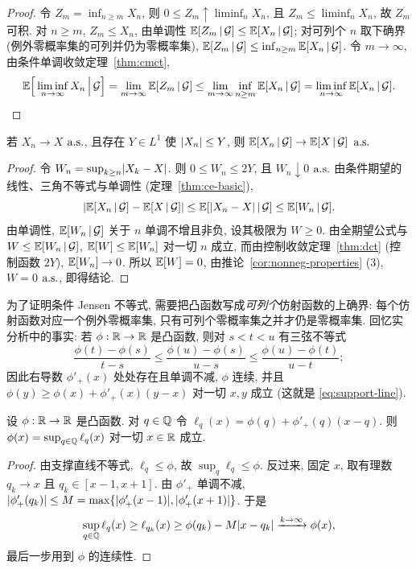 \begin{proof}
令 $Z_m=\inf_{n\ge m}X_n$, 则 $0\le Z_m\uparrow\liminf_nX_n$, 且 $Z_m\le\liminf_nX_n$, 故 $Z_m$ 可积. 对 $n\ge m$, $Z_m\le X_n$, 由单调性 $\mathbb{E}[Z_m\,|\,\mathcal{G}]\le\mathbb{E}[X_n\,|\,\mathcal{G}]$; 对可列个 $n$ 取下确界 (例外零概率集的可列并仍为零概率集), $\mathbb{E}[Z_m\,|\,\mathcal{G}]\le\inf_{n\ge m}\mathbb{E}[X_n\,|\,\mathcal{G}]$. 令 $m\to\infty$, 由条件单调收敛定理~\ref{thm:cmct},
\[
\mathbb{E}\Big[\liminf_{n\to\infty}X_n\,\Big|\,\mathcal{G}\Big]=\lim_{m\to\infty}\mathbb{E}[Z_m\,|\,\mathcal{G}]\le\lim_{m\to\infty}\inf_{n\ge m}\mathbb{E}[X_n\,|\,\mathcal{G}]=\liminf_{n\to\infty}\mathbb{E}[X_n\,|\,\mathcal{G}].\qedhere
\]
\end{proof}

\begin{theorem}[条件控制收敛定理]\label{thm:cdct}
若 $X_n\to X$ $\text{a.s.}$, 且存在 $Y\in L^1$ 使 $\lvert X_n\rvert\le Y$, 则 $\mathbb{E}[X_n\,|\,\mathcal{G}]\to\mathbb{E}[X\,|\,\mathcal{G}]$ $\text{a.s.}$
\end{theorem}

\begin{proof}
令 $W_n=\sup_{k\ge n}\lvert X_k-X\rvert$. 则 $0\le W_n\le2Y$, 且 $W_n\downarrow0$ $\text{a.s.}$ 由条件期望的线性、三角不等式与单调性 (定理~\ref{thm:ce-basic}),
\[
\lvert\mathbb{E}[X_n\,|\,\mathcal{G}]-\mathbb{E}[X\,|\,\mathcal{G}]\rvert\le\mathbb{E}[\lvert X_n-X\rvert\,|\,\mathcal{G}]\le\mathbb{E}[W_n\,|\,\mathcal{G}].
\]
由单调性, $\mathbb{E}[W_n\,|\,\mathcal{G}]$ 关于 $n$ 单调不增且非负, 设其极限为 $W\ge0$. 由全期望公式与 $W\le\mathbb{E}[W_n\,|\,\mathcal{G}]$, $\mathbb{E}[W]\le\mathbb{E}[W_n]$ 对一切 $n$ 成立, 而由控制收敛定理~\ref{thm:dct} (控制函数 $2Y$), $\mathbb{E}[W_n]\to0$. 所以 $\mathbb{E}[W]=0$, 由推论~\ref{cor:nonneg-properties} (3), $W=0$ $\text{a.s.}$, 即得结论.
\end{proof}

为了证明条件 Jensen 不等式, 需要把凸函数写成\emph{可列个}仿射函数的上确界: 每个仿射函数对应一个例外零概率集, 只有可列个零概率集之并才仍是零概率集. 回忆实分析中的事实: 若 $\phi:\mathbb{R}\to\mathbb{R}$ 是凸函数, 则对 $s<t<u$ 有三弦不等式
\[
\frac{\phi(t)-\phi(s)}{t-s}\le\frac{\phi(u)-\phi(s)}{u-s}\le\frac{\phi(u)-\phi(t)}{u-t};
\]
因此右导数 $\phi'_+(x)$ 处处存在且单调不减, $\phi$ 连续, 并且 $\phi(y)\ge\phi(x)+\phi'_+(x)(y-x)$ 对一切 $x,y$ 成立 (这就是 \eqref{eq:support-line}).

\begin{lemma}\label{lem:convex-countable}
设 $\phi:\mathbb{R}\to\mathbb{R}$ 是凸函数. 对 $q\in\mathbb{Q}$ 令 $\ell_q(x)=\phi(q)+\phi'_+(q)(x-q)$. 则 $\phi(x)=\sup_{q\in\mathbb{Q}}\ell_q(x)$ 对一切 $x\in\mathbb{R}$ 成立.
\end{lemma}

\begin{proof}
由支撑直线不等式, $\ell_q\le\phi$, 故 $\sup_q\ell_q\le\phi$. 反过来, 固定 $x$, 取有理数 $q_k\to x$ 且 $q_k\in[x-1,x+1]$. 由 $\phi'_+$ 单调不减, $\lvert\phi'_+(q_k)\rvert\le M=\max\{\lvert\phi'_+(x-1)\rvert,\lvert\phi'_+(x+1)\rvert\}$. 于是
\[
\sup_{q\in\mathbb{Q}}\ell_q(x)\ge\ell_{q_k}(x)\ge\phi(q_k)-M\lvert x-q_k\rvert\xrightarrow{k\to\infty}\phi(x),
\]
最后一步用到 $\phi$ 的连续性.
\end{proof}

